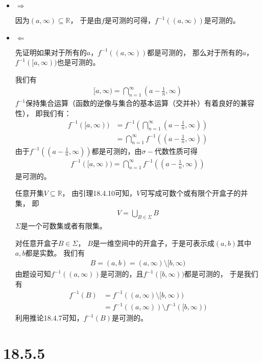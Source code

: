 \documentclass{article}
\begin{document}
\begin{itemize}
  \item $\Rightarrow$

        因为$(a, \infty) \subseteq \mathbb{R}$，
        于是由$f$是可测的可得，$f^{-1}((a, \infty))$是可测的。

  \item $\Leftarrow$

        先证明如果对于所有的$a$，$f^{-1}((a, \infty))$都是可测的，
        那么对于所有的$a$，$f^{-1}([a, \infty))$也是可测的。

        我们有
        \begin{align*}
          [a, \infty) = \bigcap\limits_{n = 1}^\infty (a - \frac{1}{n}, \infty)
        \end{align*}
        $f^{-1}$保持集合运算（函数的逆像与集合的基本运算（交并补）有着良好的兼容性），
        即我们有：
        \begin{align*}
          f^{-1}([a, \infty)) & = f^{-1}\left(\bigcap\limits_{n = 1}^\infty (a - \frac{1}{n}, \infty)\right) \\
                              & = \bigcap\limits_{n = 1}^\infty f^{-1}((a - \frac{1}{n}, \infty))
        \end{align*}
        由于$f^{-1}((a - \frac{1}{n}, \infty))$都是可测的，由$\sigma-$代数性质可得
        \begin{align*}
          f^{-1}([a, \infty)) = \bigcap\limits_{n = 1}^\infty f^{-1}((a - \frac{1}{n}, \infty))
        \end{align*}
        是可测的。

        任意开集$V \subseteq \mathbb{R}$，
        由引理18.4.10可知，$V$可写成可数个或有限个开盒子的并集，
        即
        \begin{align*}
          V = \bigcup_{B \in \Sigma} B
        \end{align*}
        $\Sigma$是一个可数集或者有限集。

        对任意开盒子$B \in \Sigma$，
        $B$是一维空间中的开盒子，于是可表示成$(a, b)$其中$a, b$都是实数。
        我们有
        \begin{align*}
          B = (a, b) = (a, \infty) \setminus [b, \infty)
        \end{align*}
        由题设可知$f^{-1}((a, \infty))$是可测的，且$f^{-1}([b, \infty))$都是可测的，
        于是我们有
        \begin{align*}
          f^{-1}(B) & = f^{-1}((a, \infty) \setminus [b, \infty))         \\
                    & = f^{-1}((a, \infty)) \setminus f^{-1}([b, \infty))
        \end{align*}
        利用推论18.4.7可知，$f^{-1}(B)$是可测的。 
\end{itemize}

\section*{18.5.5}
\end{document}
